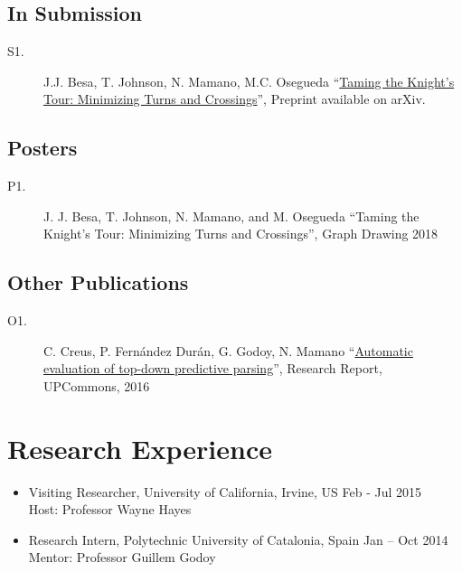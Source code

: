 \documentclass[letterpaper,10pt,oneside]{article}
\begin{document}
\subsection*{In Submission}
\begin{description}
	\item[S1.] J.J. Besa, T. Johnson, N. Mamano, M.C. Osegueda ``\href{https://arxiv.org/pdf/1904.02824.pdf}{Taming the Knight’s Tour: Minimizing Turns and Crossings}'', Preprint available on arXiv.\\
\end{description}
\subsection*{Posters}
\begin{description}
	\item[P1.] J. J. Besa, T. Johnson, N. Mamano, and M. Osegueda ``Taming the Knight’s Tour: Minimizing Turns and Crossings'', Graph Drawing 2018\\
\end{description}
\subsection*{Other Publications }
\begin{description}
	\item[O1.] C. Creus, P. Fernández Durán, G. Godoy, N. Mamano
	 ``\href{https://upcommons.upc.edu/bitstream/handle/2117/119781/Automatic\%20evaluation\%20of\%20top-down\%20predictive\%20parsing.pdf?sequence=1\&isAllowed=y}{Automatic evaluation of top-down predictive parsing}'', Research Report, UPCommons, 2016\\
\end{description}

\section*{Research Experience}
\begin{itemize}
	\item Visiting Researcher, University of California, Irvine, US \hfill Feb - Jul 2015\\ 
	Host: Professor Wayne Hayes
    \item Research Intern, Polytechnic University of Catalonia, Spain \hfill Jan -- Oct 2014\\
    Mentor: Professor Guillem Godoy
\end{itemize}
\end{document}
